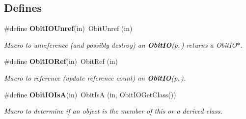 \subsection*{Defines}
\begin{CompactItemize}
\item 
\#define {\bf Obit\-IOUnref}(in)\ Obit\-Unref (in)
\begin{CompactList}\small\item\em Macro to unreference (and possibly destroy) an {\bf Obit\-IO}{\rm (p.\,\pageref{structObitIO})} returns a Obit\-IO$\ast$. \item\end{CompactList}\item 
\#define {\bf Obit\-IORef}(in)\ Obit\-Ref (in)
\begin{CompactList}\small\item\em Macro to reference (update reference count) an {\bf Obit\-IO}{\rm (p.\,\pageref{structObitIO})}. \item\end{CompactList}\item 
\#define {\bf Obit\-IOIs\-A}(in)\ Obit\-Is\-A (in, Obit\-IOGet\-Class())
\begin{CompactList}\small\item\em Macro to determine if an object is the member of this or a derived class. \item\end{CompactList}\end{CompactItemize}
